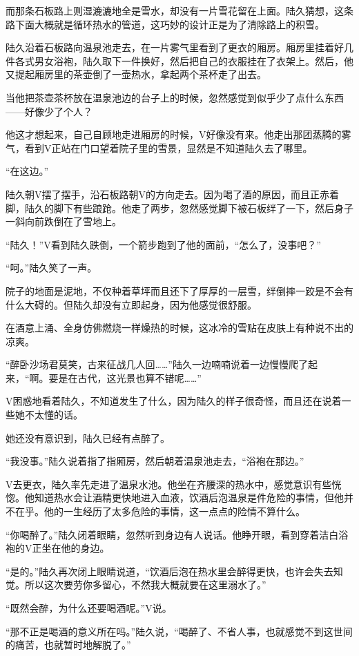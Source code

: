 而那条石板路上则湿漉漉地全是雪水，却没有一片雪花留在上面。陆久猜想，这条路下面大概就是循环热水的管道，这巧妙的设计正是为了清除路上的积雪。

陆久沿着石板路向温泉池走去，在一片雾气里看到了更衣的厢房。厢房里挂着好几件各式男女浴袍，陆久取下一件换好，然后把自己的衣服挂在了衣架上。然后，他又提起厢房里的茶壶倒了一壶热水，拿起两个茶杯走了出去。

当他把茶壶茶杯放在温泉池边的台子上的时候，忽然感觉到似乎少了点什么东西——好像少了个人？

他这才想起来，自己自顾地走进厢房的时候，V好像没有来。他走出那团蒸腾的雾气，看到V正站在门口望着院子里的雪景，显然是不知道陆久去了哪里。

“在这边。”

陆久朝V摆了摆手，沿石板路朝V的方向走去。因为喝了酒的原因，而且正赤着脚，陆久的脚下有些踉跄。他走了两步，忽然感觉脚下被石板绊了一下，然后身子一斜向前跌倒在了雪地上。

“陆久！”V看到陆久跌倒，一个箭步跑到了他的面前，“怎么了，没事吧？”

“呵。”陆久笑了一声。

院子的地面是泥地，不仅种着草坪而且还下了厚厚的一层雪，绊倒摔一跤是不会有什么大碍的。但陆久却没有立即起身，因为他感觉很舒服。

在酒意上涌、全身仿佛燃烧一样燥热的时候，这冰冷的雪贴在皮肤上有种说不出的凉爽。

“醉卧沙场君莫笑，古来征战几人回……”陆久一边喃喃说着一边慢慢爬了起来，“啊。要是在古代，这光景也算不错呢……”

V困惑地看着陆久，不知道发生了什么，因为陆久的样子很奇怪，而且还在说着一些她不太懂的话。

她还没有意识到，陆久已经有点醉了。

“我没事。”陆久说着指了指厢房，然后朝着温泉池走去，“浴袍在那边。”

V去更衣，陆久率先走进了温泉水池。他坐在齐腰深的热水中，感觉意识有些恍惚。他知道热水会让酒精更快地进入血液，饮酒后泡温泉是件危险的事情，但他并不在乎。他的一生经历了太多危险的事情，这一点点的险情不算什么。

“你喝醉了。”陆久闭着眼睛，忽然听到身边有人说话。他睁开眼，看到穿着洁白浴袍的V正坐在他的身边。

“是的。”陆久再次闭上眼睛说道，“饮酒后泡在热水里会醉得更快，也许会失去知觉。所以这次要劳你多留心，不然我大概就要在这里溺水了。”

“既然会醉，为什么还要喝酒呢。”V说。

“那不正是喝酒的意义所在吗。”陆久说，“喝醉了、不省人事，也就感觉不到这世间的痛苦，也就暂时地解脱了。”

